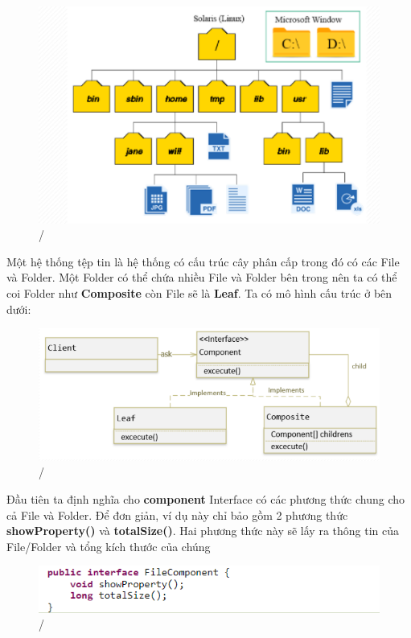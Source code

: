 \begin{figure}[!htb]
    \centering
    \includegraphics[width=\textwidth]{fig/Composite/FileStructure.png}/
\end{figure}

Một hệ thống tệp tin là hệ thống có cấu trúc cây phân cấp trong đó có các File và Folder. Một Folder có thể chứa nhiều File và Folder bên trong nên ta có thể coi Folder như \textbf{Composite} còn File sẽ là \textbf{Leaf}. Ta có mô hình cấu trúc ở bên dưới:

\begin{figure}[!htb]
    \centering
    \includegraphics[width=\textwidth]{fig/Composite/FileDiagram.png}/
\end{figure}\newpage

Đầu tiên ta định nghĩa cho \textbf{component} Interface có các phương thức chung cho cả File và Folder. Để đơn giản, ví dụ này chỉ bảo gồm 2 phương thức \textbf{showProperty()} và \textbf{totalSize()}. Hai phương thức này sẽ lấy ra thông tin của File/Folder và tổng kích thước của chúng

\begin{figure}[!htb]
    \centering
    \includegraphics[width=\textwidth]{fig/Composite/FileComponent.png}/
\end{figure}

